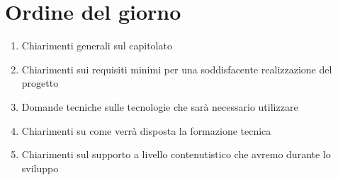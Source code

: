 \documentclass[a4paper,12pt]{article}
\begin{document}
\section{Ordine del giorno}

\begin{enumerate}
    \item Chiarimenti generali sul capitolato
    \item Chiarimenti sui requisiti minimi per una soddisfacente realizzazione del progetto
    \item Domande tecniche sulle tecnologie che sarà necessario utilizzare
    \item Chiarimenti su come verrà disposta la formazione tecnica
    \item Chiarimenti sul supporto a livello contenutistico che avremo durante lo sviluppo
\end{enumerate}
\end{document}
